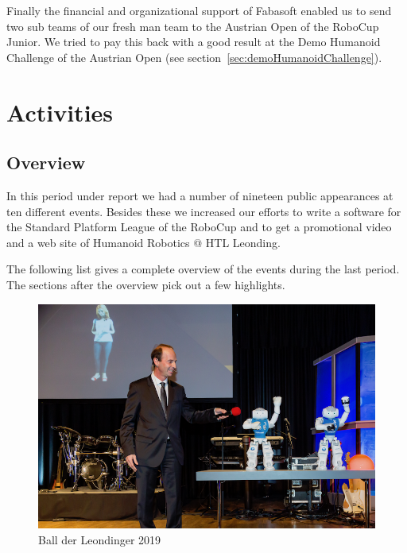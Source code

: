 \documentclass[11pt]{article}
\begin{document}
Finally the financial and organizational support of Fabasoft enabled us to send two sub teams of our fresh man team to the Austrian Open of the RoboCup Junior. We tried to pay this back with a good result at the Demo Humanoid Challenge of the Austrian Open (see section~\ref{sec:demoHumanoidChallenge}).

\section{Activities}
\subsection{Overview}
In this period under report we had a number of nineteen public appearances at ten different events. Besides these we increased our efforts to write a software for the Standard Platform League of the RoboCup and to get a promotional video and a web site of Humanoid Robotics @ HTL Leonding.

The following list gives a complete overview of the events during the last period. The sections after the overview pick out a few highlights.

\begin{figure}
\begin{center}
\includegraphics[scale=0.38]{img/ballDerLeondinger.png}
\end{center}
\caption{Ball der Leondinger 2019}
\label{fig:ballDerLeondinger}
\end{figure}
\end{document}
